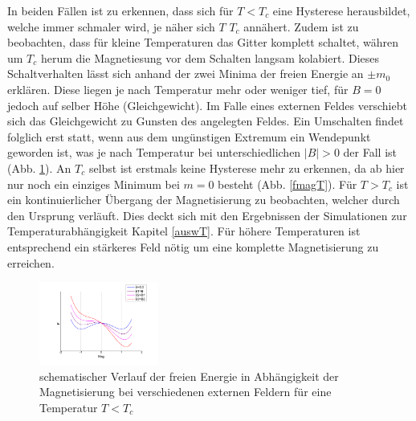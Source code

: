 In beiden Fällen ist zu erkennen, dass sich für $T<T_{c}$ eine Hysterese herausbildet, welche immer schmaler wird, je näher sich $T$ $T_{c}$ annähert. Zudem ist zu beobachten, dass für kleine Temperaturen das Gitter komplett schaltet, währen um $T_{c}$ herum die Magnetiesung vor dem Schalten langsam kolabiert. Dieses Schaltverhalten lässt sich anhand der zwei Minima der freien Energie an $\pm m_{0}$ erklären. Diese liegen je nach Temperatur mehr oder weniger tief, für $B=0$ jedoch auf selber Höhe (Gleichgewicht). Im Falle eines externen Feldes verschiebt sich das Gleichgewicht zu Gunsten des angelegten Feldes. Ein Umschalten findet folglich erst statt, wenn aus dem ungünstigen Extremum ein Wendepunkt geworden ist, was je nach Temperatur bei unterschiedlichen $|B|>0$ der Fall ist (Abb. \ref{fmagB}). An $T_{c}$ selbst ist erstmals keine Hysterese mehr zu erkennen, da ab hier nur noch ein einziges Minimum bei $m=0$ besteht (Abb. \ref{fmagT}). Für $T>T_{c}$ ist ein kontinuierlicher Übergang der Magnetisierung zu beobachten, welcher durch den Ursprung verläuft. Dies deckt sich mit den Ergebnissen der Simulationen zur Temperaturabhängigkeit Kapitel \ref{auswT}. Für höhere Temperaturen ist entsprechend ein stärkeres Feld nötig um eine komplette Magnetisierung zu erreichen. 
\begin{figure}[H]
	\centering
	\includegraphics[width=0.35\textwidth]{../Graph_Export/F(mag)_B.jpg}
	\caption{schematischer Verlauf der freien Energie in Abhängigkeit der Magnetisierung bei verschiedenen externen Feldern für eine Temperatur $T<T_c$}
	\label{fmagB}
\end{figure}

